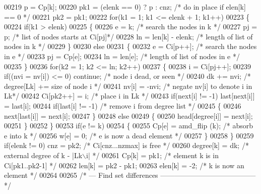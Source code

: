 \begin{DoxyCode}
00219     p = Cp[k];
00220     pk1 = (elenk == 0) ? p : cnz;      \textcolor{comment}{/* do in place if elen[k] == 0 */}
00221     pk2 = pk1;
00222     \textcolor{keywordflow}{for}(k1 = 1; k1 <= elenk + 1; k1++)
00223     \{
00224       \textcolor{keywordflow}{if}(k1 > elenk)
00225       \{
00226         e = k;                     \textcolor{comment}{/* search the nodes in k */}
00227         pj = p;                    \textcolor{comment}{/* list of nodes starts at Ci[pj]*/}
00228         ln = len[k] - elenk;      \textcolor{comment}{/* length of list of nodes in k */}
00229       \}
00230       \textcolor{keywordflow}{else}
00231       \{
00232         e = Ci[p++];              \textcolor{comment}{/* search the nodes in e */}
00233         pj = Cp[e];
00234         ln = len[e];              \textcolor{comment}{/* length of list of nodes in e */}
00235       \}
00236       \textcolor{keywordflow}{for}(k2 = 1; k2 <= ln; k2++)
00237       \{
00238         i = Ci[pj++];
00239         \textcolor{keywordflow}{if}((nvi = nv[i]) <= 0) \textcolor{keywordflow}{continue}; \textcolor{comment}{/* node i dead, or seen */}
00240         dk += nvi;                 \textcolor{comment}{/* degree[Lk] += size of node i */}
00241         nv[i] = -nvi;             \textcolor{comment}{/* negate nv[i] to denote i in Lk*/}
00242         Ci[pk2++] = i;            \textcolor{comment}{/* place i in Lk */}
00243         \textcolor{keywordflow}{if}(next[i] != -1) last[next[i]] = last[i];
00244         \textcolor{keywordflow}{if}(last[i] != -1)         \textcolor{comment}{/* remove i from degree list */}
00245         \{
00246           next[last[i]] = next[i];
00247         \}
00248         \textcolor{keywordflow}{else}
00249         \{
00250           head[degree[i]] = next[i];
00251         \}
00252       \}
00253       \textcolor{keywordflow}{if}(e != k)
00254       \{
00255         Cp[e] = amd\_flip (k);      \textcolor{comment}{/* absorb e into k */}
00256         w[e] = 0;                 \textcolor{comment}{/* e is now a dead element */}
00257       \}
00258     \}
00259     \textcolor{keywordflow}{if}(elenk != 0) cnz = pk2;         \textcolor{comment}{/* Ci[cnz...nzmax] is free */}
00260     degree[k] = dk;                   \textcolor{comment}{/* external degree of k - |Lk\(\backslash\)i| */}
00261     Cp[k] = pk1;                      \textcolor{comment}{/* element k is in Ci[pk1..pk2-1] */}
00262     len[k] = pk2 - pk1;
00263     elen[k] = -2;                     \textcolor{comment}{/* k is now an element */}
00264     
00265     \textcolor{comment}{/* --- Find set differences ----------------------------------------- */}

\end{DoxyCode}
